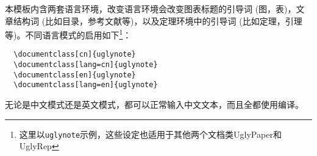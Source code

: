 本模板内含两套语言环境，改变语言环境会改变图表标题的引导词 (图，表)，文章结构词 (比如目录，参考文献等)，以及定理环境中的引导词 (比如定理，引理等)。不同语言模式的启用如下\footnote{这里以\texttt{uglynote}示例，这些设定也适用于其他两个文档类UglyPaper和UglyRep}：

\begin{verbatim} 
  \documentclass[cn]{uglynote} 
  \documentclass[lang=cn]{uglynote} 
  \documentclass[en]{uglynote} 
  \documentclass[lang=en]{uglynote}
\end{verbatim}

\begin{note}
  无论是中文模式还是英文模式，都可以正常输入中文文本，而且全都使用编译。
\end{note}